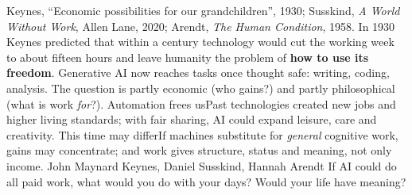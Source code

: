 {Keynes, ``Economic possibilities for our grandchildren'', 1930; Susskind, \emph{A World Without Work}, Allen Lane, 2020; Arendt, \emph{The Human Condition}, 1958.}
{In 1930 Keynes predicted that within a century technology would cut the working week to about fifteen hours and leave humanity the problem of \textbf{how to use its freedom}. Generative AI now reaches tasks once thought safe: writing, coding, analysis. The question is partly economic (who gains?) and partly philosophical (what is work \emph{for}?).}
{Automation frees us}{Past technologies created new jobs and higher living standards; with fair sharing, AI could expand leisure, care and creativity.}
{This time may differ}{If machines substitute for \emph{general} cognitive work, gains may concentrate; and work gives structure, status and meaning, not only income.}
{John Maynard Keynes, Daniel Susskind, Hannah Arendt}
{If AI could do all paid work, what would you do with your days? Would your life have meaning?}
